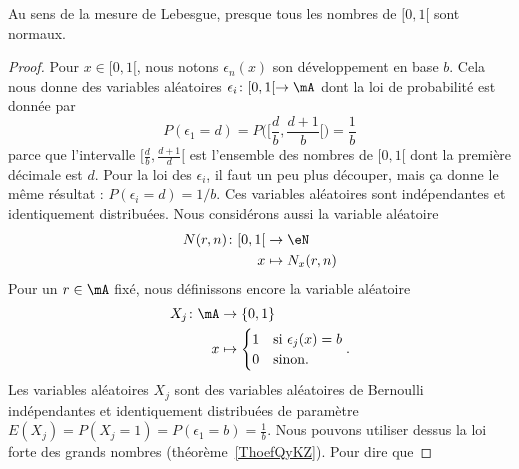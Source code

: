 \begin{proposition}     \label{PropEEOXLae}
	Au sens de la mesure de Lebesgue, presque tous les nombres de \( \mathopen[ 0 , 1 [\) sont normaux.
\end{proposition}

\begin{proof}
	Pour \( x\in\mathopen[ 0 , 1 [\), nous notons \( \epsilon_n(x)\) son développement en base \( b\). Cela nous donne des variables aléatoires \( \epsilon_i\colon \mathopen[ 0 , 1 [\to \mA\) dont la loi de probabilité est donnée par
	\begin{equation}
		P(\epsilon_1=d)=P\big( \mathopen[ \frac{ d }{ b } , \frac{ d+1 }{ b } [ \big)=\frac{1}{ b }
	\end{equation}
	parce que l'intervalle \( \mathopen[ \frac{ d }{ b } , \frac{ d+1 }{ d } [\) est l'ensemble des nombres de \( \mathopen[ 0 , 1 [\) dont la première décimale est \( d\). Pour la loi des \( \epsilon_i\), il faut un peu plus découper, mais ça donne le même résultat : \( P(\epsilon_i=d)=1/b\). Ces variables aléatoires sont indépendantes et identiquement distribuées. Nous considérons aussi la variable aléatoire
	\begin{equation}
		\begin{aligned}
			N(r,n)\colon \mathopen[ 0 , 1 [ & \to \eN          \\
			x                               & \mapsto N_x(r,n)
		\end{aligned}
	\end{equation}
	Pour un \( r\in\mA\) fixé, nous définissons encore la variable aléatoire
	\begin{equation}
		\begin{aligned}
			X_j\colon \mA & \to \{ 0,1 \}                          \\
			x             & \mapsto \begin{cases}
				                        1 & \text{si } \epsilon_j(x)=b \\
				                        0 & \text{sinon.}
			                        \end{cases}.
		\end{aligned}
	\end{equation}
	Les variables aléatoires \( X_j\) sont des variables aléatoires de Bernoulli indépendantes et identiquement distribuées de paramètre \( E(X_j)=P(X_j=1)=P(\epsilon_1=b)=\frac{1}{ b }\). Nous pouvons utiliser dessus la loi forte des grands nombres (théorème~\ref{ThoefQyKZ}). Pour dire que

\end{proof}
